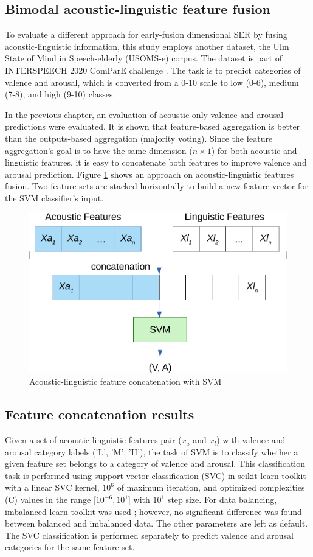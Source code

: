 \subsection{Bimodal acoustic-linguistic feature fusion}
To evaluate a different approach for early-fusion dimensional SER by fusing
acoustic-linguistic information, this study employs another dataset, the Ulm
State of Mind in Speech-elderly (USOMS-e) corpus. The dataset is part of
INTERSPEECH 2020 ComParE challenge \cite{Schuller}. The task is to predict
categories of valence and arousal, which is converted from a 0-10 scale to low
(0-6), medium (7-8), and high (9-10) classes.

In the previous chapter, an evaluation of acoustic-only valence and arousal
predictions were evaluated. It is shown that feature-based aggregation is
better than the outputs-based aggregation (majority voting). Since the feature
aggregation's goal is to have the same dimension ($n \times 1$) for both
acoustic and linguistic features, it is easy to concatenate both features to
improve valence and arousal prediction. Figure \ref{fig:feature_fusion} shows
an approach on acoustic-linguistic features fusion.  Two feature sets are
stacked horizontally to build a new feature vector for the SVM classifier's
input. 

\begin{figure}[t]
  \centering
  \includegraphics[width=0.7\linewidth]{../fig/feature_fusion.pdf}
  \caption{Acoustic-linguistic feature concatenation with SVM}
  \label{fig:feature_fusion}
\end{figure}

\subsection{Feature concatenation results}
Given a set of acoustic-linguistic features pair ($x_a$ and $x_l$) with valence
and arousal category labels ('L', 'M', 'H'), the task of SVM is to classify
whether a given feature set belongs to a category of valence and arousal. This
classification task is performed using support vector classification (SVC) in
scikit-learn toolkit \cite{scikit-learn} with a linear SVC kernel, $10^6$ of
maximum iteration, and optimized complexities (C) values in the range
[$10^{-6}, 10^1$] with $10^{1}$ step size. For data balancing, imbalanced-learn
toolkit was used \cite{Lemaitre2017}; however, no significant difference was
found between balanced and imbalanced data. The other parameters are left as
default. The SVC classification is performed separately to predict valence and
arousal categories for the same feature set.


